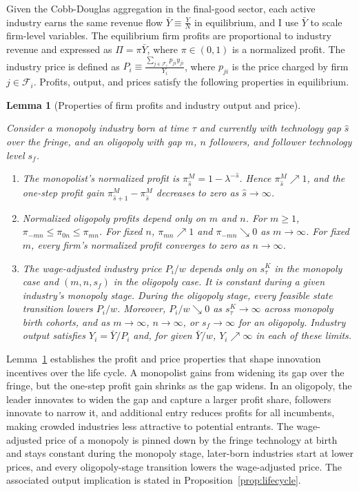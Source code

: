 \documentclass[12pt]{article}
\newtheorem{lemma}[proposition]{Lemma}
\begin{document}
Given the Cobb-Douglas aggregation in the final-good sector, each active industry earns the same revenue flow \(\bar{Y}\equiv\frac{Y}{N}\) in equilibrium, and I use \(\bar{Y}\) to scale firm-level variables. The equilibrium firm profits are proportional to industry revenue and expressed as \(\Pi=\pi\bar{Y}\), where \(\pi\in(0,1)\) is a normalized profit. The industry price is defined as \(P_i\equiv\frac{\sum_{j\in\mathcal{F}_i}p_{ji}y_{ji}}{Y_i}\), where \(p_{ji}\) is the price charged by firm \(j\in\mathcal{F}_i\). Profits, output, and prices satisfy the following properties in equilibrium.

\begin{lemma}[Properties of firm profits and industry output and price]\label{lem:static_pricing}

Consider a monopoly industry born at time \(\tau\) and currently with technology gap \(\hat{s}\) over the fringe, and an oligopoly with gap \(m\), \(n\) followers, and follower technology level \(s_f\).

\begin{enumerate}
    \item The monopolist's normalized profit is \(\pi^M_{\hat{s}}=1-\lambda^{-\hat{s}}\). Hence \(\pi^M_{\hat{s}}\nearrow1\), and the one-step profit gain \(\pi^M_{\hat{s}+1}-\pi^M_{\hat{s}}\) decreases to zero as \(\hat{s}\to\infty\).
    \item Normalized oligopoly profits depend only on \(m\) and \(n\). For \(m\geq1\), \(\pi_{-mn}\leq\pi_{0n}\leq\pi_{mn}\). For fixed \(n\), \(\pi_{mn}\nearrow1\) and \(\pi_{-mn}\searrow0\) as \(m\to\infty\). For fixed \(m\), every firm's normalized profit converges to zero as \(n\to\infty\).
    \item The wage-adjusted industry price \(P_i/w\) depends only on \(s^K_\tau\) in the monopoly case and \((m,n,s_f)\) in the oligopoly case. It is constant during a given industry's monopoly stage. During the oligopoly stage, every feasible state transition lowers \(P_i/w\). Moreover, \(P_i/w\searrow0\) as \(s^K_\tau\rightarrow\infty\) across monopoly birth cohorts, and as \(m\rightarrow\infty\), \(n\rightarrow\infty\), or \(s_f\rightarrow\infty\) for an oligopoly. Industry output satisfies \(Y_i=\bar{Y}/P_i\) and, for given \(\bar{Y}/w\), \(Y_i\nearrow\infty\) in each of these limits.
\end{enumerate}
\end{lemma}

Lemma~\ref{lem:static_pricing} establishes the profit and price properties that shape innovation incentives over the life cycle. A monopolist gains from widening its gap over the fringe, but the one-step profit gain shrinks as the gap widens. In an oligopoly, the leader innovates to widen the gap and capture a larger profit share, followers innovate to narrow it, and additional entry reduces profits for all incumbents, making crowded industries less attractive to potential entrants. The wage-adjusted price of a monopoly is pinned down by the fringe technology at birth and stays constant during the monopoly stage, later-born industries start at lower prices, and every oligopoly-stage transition lowers the wage-adjusted price. The associated output implication is stated in Proposition~\ref{prop:lifecycle}.
\end{document}
